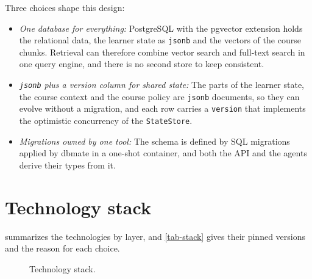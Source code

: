 Three choices shape this design:
\begin{itemize}
  \item \emph{One database for everything:} PostgreSQL with the pgvector
        extension holds the relational data, the learner state as
        \texttt{jsonb} and the vectors of the course chunks. Retrieval can
        therefore combine vector search and full-text search in one query
        engine, and there is no second store to keep consistent.
  \item \emph{\texttt{jsonb} plus a version column for shared state:} The
        parts of the learner state, the course context and the course
        policy are \texttt{jsonb} documents, so they can evolve without a
        migration, and each row carries a \texttt{version} that implements
        the optimistic concurrency of the \texttt{StateStore}.
  \item \emph{Migrations owned by one tool:} The schema is defined by SQL
        migrations applied by dbmate in a one-shot container, and both the
        API and the agents derive their types from it.
\end{itemize}

\section{Technology stack}
\label{sec-d-stack}

 summarizes the technologies by layer, and
\cref{tab-stack} gives their pinned versions and the reason for each
choice.

\begin{figure}[htbp]
  \centering
  \caption{Technology stack.}
  \label{fig-stack}
\end{figure}

